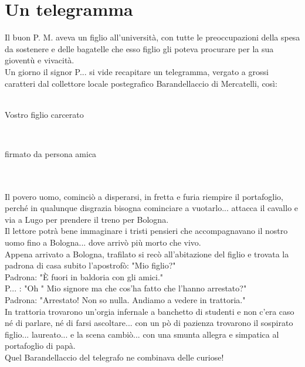 
\chapter{Un telegramma}
Il buon P. M. aveva un figlio all'università, con tutte le preoccupazioni della spesa da sostenere e delle bagatelle che esso figlio gli poteva procurare per la sua gioventù e vivacità.\\
Un giorno il signor P.\:.\:.\: si vide recapitare un telegramma, vergato a grossi caratteri dal collettore locale postegrafico Barandellaccio di Mercatelli, così:\\ \textcal \Huge\\
\centerline {Vostro figlio carcerato}\\
\centerline {firmato da persona amica}\\ \normalfont \normalsize \\
Il povero uomo, cominciò a disperarsi, in fretta e furia riempire il portafoglio, perché in qualunque disgrazia bisogna cominciare a vuotarlo... attacca il cavallo e via a Lugo per prendere il treno per Bologna.\\
Il lettore potrà bene immaginare i tristi pensieri che accompagnavano il nostro uomo fino a Bologna... dove arrivò più morto che vivo.\\
Appena arrivato a Bologna, trafilato si recò all'abitazione del figlio e trovata la padrona di casa subito l'apostrofò: "Mio figlio?"\\
Padrona: "È fuori in baldoria con gli amici."\\
P.\:.\:.\: : "Oh " Mio signore ma che cos'ha fatto che l'hanno arrestato?"\\
Padrona: "Arrestato! Non so nulla. Andiamo a vedere in trattoria."\\
In trattoria trovarono un'orgia infernale a banchetto di studenti e non c'era caso né di parlare, né di farsi ascoltare... con un pò di pazienza trovarono il sospirato figlio... laureato... e la scena cambiò... con una smunta allegra e simpatica al portafoglio di papà.\\
Quel Barandellaccio del telegrafo ne combinava delle curiose!

